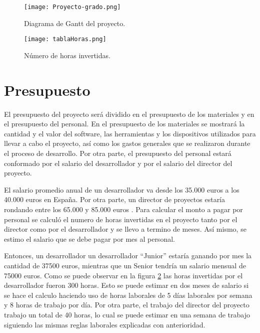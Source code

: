 \begin{figure}[H]
\begin{center}
\texttt{[image: Proyecto-grado.png]}
\caption{Diagrama de Gantt del proyecto.}\label{fig1}
\end{center}
\end{figure}


\begin{figure}[H]
\begin{center}
\texttt{[image: tablaHoras.png]}
\caption{Número de horas invertidas.}\label{fig:horasProyecto}
\end{center}
\end{figure}

\section{Presupuesto}

El presupuesto del proyecto será dividido en el presupuesto de los materiales y en el presupuesto del personal. En el presupuesto de los materiales se mostrará la cantidad y el valor del software, las herramientas y los dispositivos utilizados para llevar a cabo el proyecto, así como los gastos generales que se realizaron durante el proceso de desarrollo. Por otra parte, el presupuesto del personal estará conformado por el salario del desarrollador y por el salario del director del proyecto. 

El salario promedio anual de un desarrollador va desde los 35.000 euros a los 40.000 euros en España. Por otra parte, un director de proyectos estaría rondando entre los 65.000 y 85.000 euros \cite{salario}. Para calcular el monto a pagar por personal se calculó el numero de horas invertidas en el proyecto tanto por el director como por el desarrollador y se llevo a termino de meses. Así mismo, se estimo el salario que se debe pagar por mes al personal.

Entonces, un desarrollador un desarrollador ``Junior'' estaría ganando por mes la cantidad de 37500 euros, mientras que un Senior tendría un salario mensual de 75000 euros. Como se puede observar en la figura \ref{fig:horasProyecto} las horas invertidas por el desarrollador fueron 300 horas. Esto se puede estimar en dos meses de salario si se hace el calculo haciendo uso de horas laborales de 5 días laborales por semana y 8 horas de trabajo por día. Por otra parte, el trabajo del director del proyecto trabajo un total de 40 horas, lo cual se puede estimar en una semana de trabajo siguiendo las mismas reglas laborales explicadas con anterioridad. 


